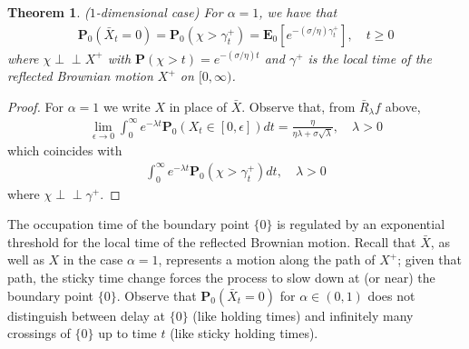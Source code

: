 \documentclass[11pt,a4paper]{article}
\newtheorem{theorem}{Theorem}[section]
\newcommand{\indep}{\perp \! \! \! \perp}
\begin{document}
\begin{theorem}
($1$-dimensional case) For $\alpha = 1$, we have that 
\begin{align*}
\mathbf{P}_0(\bar{X}_t = 0) = \mathbf{P}_0(\chi > \gamma^+_t) = \mathbf{E}_0 \left[ e^{-(\sigma / \eta) \gamma^+_t} \right], \quad t \geq 0
\end{align*}
where $\chi \indep X^+$ with $\mathbf{P}(\chi > t) = e^{-(\sigma/\eta) t}$ and $\gamma^+$ is the local time of the reflected Brownian motion $X^+$ on $[0, \infty)$. 
\label{thm:threshold} 
\end{theorem}
\begin{proof}
For $\alpha=1$ we write $X$ in place of $\bar{X}$. Observe that, from $\bar{R}_\lambda f$ above, 
\begin{align*}
\lim_{\epsilon \to 0} \int_0^\infty e^{-\lambda t} \mathbf{P}_0(X_t \in [0, \epsilon]) dt = \frac{\eta}{\eta \lambda + \sigma \sqrt{\lambda}} , \quad \lambda >0
\end{align*}
which coincides with 
\begin{align*}
\int_0^\infty e^{-\lambda t} \mathbf{P}_0(\chi > \gamma^+_t) dt, \quad \lambda >0
\end{align*}
where $\chi \indep \gamma^+$.
\end{proof}

The occupation time of the boundary point $\{0\}$ is regulated by an exponential threshold for the local time of the reflected Brownian motion. Recall that $\bar{X}$, as well as $X$ in the case $\alpha=1$, represents a motion along the path of $X^{+}$; given that path, the sticky time change forces the process to slow down at (or near) the boundary point $\{0\}$. Observe that $\mathbf{P}_0(\bar{X}_t=0)$ for $\alpha \in (0,1)$ does not distinguish between delay at $\{0\}$ (like holding times) and infinitely many crossings of $\{0\}$ up to time $t$ (like sticky holding times). 
\end{document}
